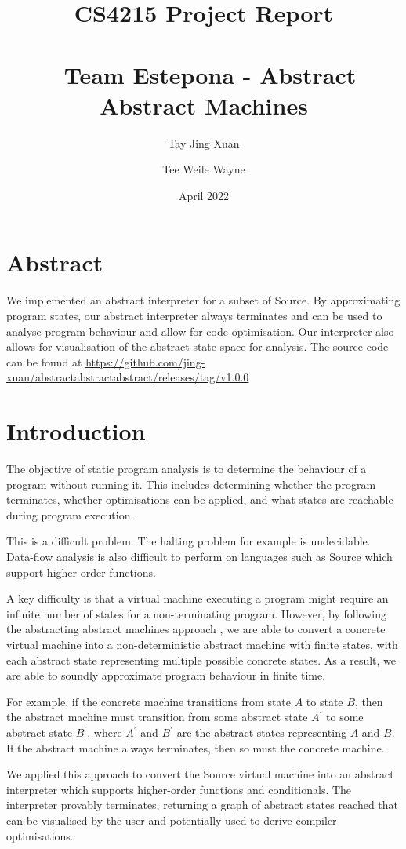 \documentclass[12pt]{article}
\title{CS4215 Project Report \\\ \\\
Team Estepona - Abstract Abstract Machines}
\author{Tay Jing Xuan \and Tee Weile Wayne}
\date{April 2022}
\begin{document}
\maketitle

\section{Abstract}
We implemented an abstract interpreter for a subset of Source. By approximating program states, our abstract interpreter always terminates and can be used to analyse program behaviour and allow for code optimisation. Our interpreter also allows for visualisation of the abstract state-space for analysis. The source code can be found at \url{https://github.com/jing-xuan/abstractabstractabstract/releases/tag/v1.0.0}

\section{Introduction}
The objective of static program analysis is to determine the behaviour of a program without running it. This includes determining whether the program terminates, whether optimisations can be applied, and what states are reachable during program execution.

This is a difficult problem. The halting problem for example is undecidable. Data-flow analysis is also difficult to perform on languages such as Source which support higher-order functions.

A key difficulty is that a virtual machine executing a program might require an infinite number of states for a non-terminating program. However, by following the abstracting abstract machines approach \cite{aam}, we are able to convert a concrete virtual machine into a non-deterministic abstract machine with finite states, with each abstract state representing multiple possible concrete states. As a result, we are able to soundly approximate program behaviour in finite time.

For example, if the concrete machine transitions from state $A$ to state $B$, then the abstract machine must transition from some abstract state $A^{\prime}$ to some abstract state $B^{\prime}$, where $A^{\prime}$ and $B^{\prime}$ are the abstract states representing $A$ and $B$. If the abstract machine always terminates, then so must the concrete machine.

We applied this approach to convert the Source virtual machine into an abstract interpreter which supports higher-order functions and conditionals. The interpreter provably terminates, returning a graph of abstract states reached that can be visualised by the user and potentially used to derive compiler optimisations.
\end{document}
